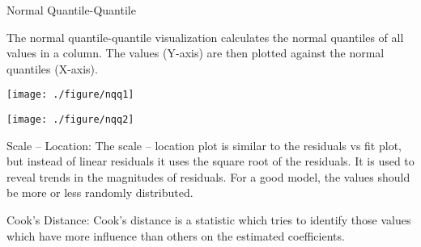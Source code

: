 \documentclass{article}\usepackage[]{graphicx}\usepackage[]{xcolor}
\begin{document}
Normal Quantile-Quantile

The normal quantile-quantile visualization calculates the normal quantiles of all values in a column. The values (Y-axis) are then plotted against the normal quantiles (X-axis).

\texttt{[image: ./figure/nqq1]}


\texttt{[image: ./figure/nqq2]}

Scale – Location:
The scale – location plot is similar to the residuals vs fit plot, but instead of linear residuals it uses the square root of the residuals. It is used to reveal trends in the magnitudes of residuals. For a good model, the values should be more or less randomly distributed.

Cook's Distance:
Cook's distance is a statistic which tries to identify those values which have more influence than others on the estimated coefficients. 
\end{document}
